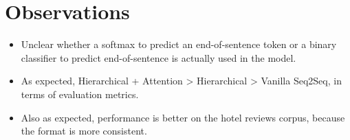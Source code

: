 \documentclass[12pt]{scrartcl}
\begin{document}
\section{Observations}
  \begin{itemize}
    \item Unclear whether a softmax to predict an end-of-sentence token or a binary classifier to predict end-of-sentence is actually used in the model.
    \item As expected, Hierarchical + Attention > Hierarchical > Vanilla Seq2Seq, in terms of evaluation metrics.
    \item Also as expected, performance is better on the hotel reviews corpus, because the format is more consistent.
  \end{itemize}



\end{document}
